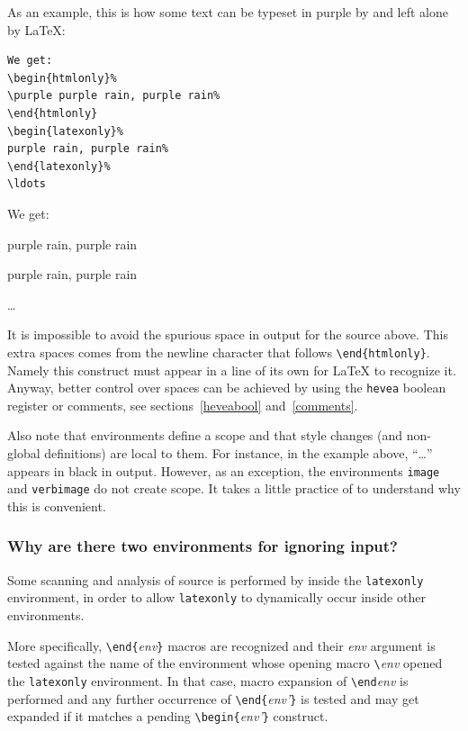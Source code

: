 \noindent As an example, this is how some text can be typeset in purple by
\hevea{} and left alone by \LaTeX{}:
\begin{verbatim}
We get:
\begin{htmlonly}%
\purple purple rain, purple rain%
\end{htmlonly}
\begin{latexonly}%
purple rain, purple rain%
\end{latexonly}%
\ldots
\end{verbatim}
We get:
\begin{htmlonly}%
\purple purple rain, purple rain%
\end{htmlonly}
\begin{latexonly}%
purple rain, purple rain%
\end{latexonly}%
\ldots

It is impossible to avoid the spurious space in \hevea{} output
for the source above.
This extra spaces comes from the newline character that follows
\verb+\end{htmlonly}+. Namely this
construct must appear in a line of its own for
\LaTeX{} to recognize it. Anyway, better control over spaces
can be achieved
by using the \texttt{hevea} boolean register
or comments, see sections~\ref{heveabool}
and~\ref{comments}.

Also note that environments define a scope and that style changes
(and non-global definitions) are local to them. For instance, in the
example above, ``\ldots'' appears in black in \html{} output.
However, as an exception, the environments \texttt{image}
and \texttt{verbimage} do not create scope.
It takes a little practice of \hevea{} to understand why this is
convenient.





\subsubsection{Why are there two environments for ignoring input?}\label{why}
Some scanning and analysis of source is performed
by \hevea{} inside the \texttt{latexonly} environment, in order to
allow  \texttt{latexonly} to dynamically occur inside other environments.

More specifically, \verb+\end{+\textit{env}\verb+}+ macros
are recognized and their \textit{env} argument is tested against
the name of the environment whose opening macro \verb+\+\textit{env}
opened the \texttt{latexonly} environment.
In that case, macro expansion of \verb+\end+\textit{env} is performed and
any further occurrence of  \verb+\end{+\textit{env'}\verb+}+ is tested
and may get expanded if it matches a pending
\verb+\begin{+\textit{env'}\verb+}+
construct.


